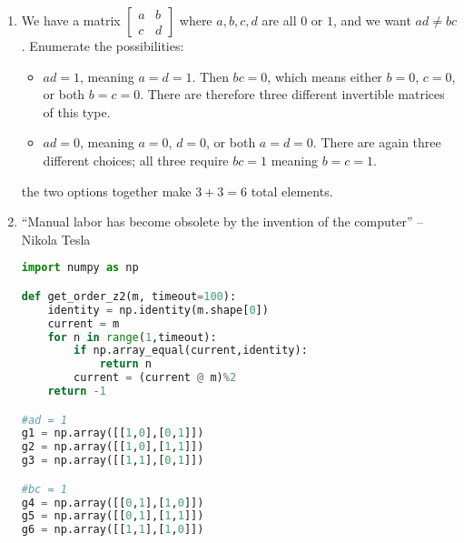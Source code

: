 \documentclass[]{article}
\begin{document}
\begin{enumerate}


\item We have a matrix $\begin{bmatrix}a&b\\c&d\end{bmatrix}$ where $a,b,c,d$ are all $0$ or $1$, and we want $ad \neq bc$. Enumerate the possibilities:
\begin{itemize}
\item $ad = 1$, meaning $a=d=1$. Then $bc = 0$, which means either $b=0$, $c=0$, or both $b=c=0$. There are therefore three different invertible matrices of this type.
\item $ad = 0$, meaning $a=0$, $d=0$, or both $a=d=0$. There are again three different choices; all three require $bc=1$ meaning $b=c=1$.
\end{itemize}
the two options together make $3+3=6$ total elements.


\item ``Manual labor has become obsolete by the invention of the computer'' -- Nikola Tesla

\begin{lstlisting}[language=Python]
import numpy as np

def get_order_z2(m, timeout=100):
    identity = np.identity(m.shape[0])
    current = m
    for n in range(1,timeout):
        if np.array_equal(current,identity):
            return n
        current = (current @ m)%2
    return -1

#ad = 1
g1 = np.array([[1,0],[0,1]])
g2 = np.array([[1,0],[1,1]])
g3 = np.array([[1,1],[0,1]])

#bc = 1
g4 = np.array([[0,1],[1,0]])
g5 = np.array([[0,1],[1,1]])
g6 = np.array([[1,1],[1,0]])


\end{lstlisting}
\end{enumerate}
\end{document}
